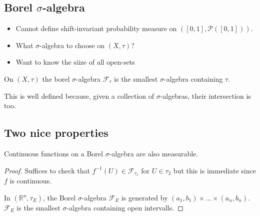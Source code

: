 \documentclass[../main.tex]{subfiles}
\begin{document}
\subsection{Borel $\sigma$-algebra}
\begin{itemize}
	\item Cannot define shift-invariant probability measure on $ ( [ 0,1] , \mathcal{P}( [ 0,1] ) ) $.
	\item What $\sigma$-algebra to choose on $( X,\tau) $?
	\item Want to know the siize of all open-sets
\end{itemize}
\begin{defn}
	On $( X,\tau) $ the borel $\sigma$-algebra $ \mathcal{F}_{\tau} $ is the smallest $\sigma$-algebra containing $\tau$.
\end{defn}
This is well defined because, given a collection of $\sigma$-algebras, their intersection is too.
\subsection*{Two nice properties}
\begin{itemize}
\item Continuous functions on a Borel $\sigma$-algebra are also measurable.
	\begin{proof}
		Suffices to check that $f^{-1}( U) \in \mathcal{F}_{\tau_1} $ for $U\in \tau_2$ but this is immediate since $f$ is continuous.
	\item In $( \mathbb{R}^{n},\tau_E )$, the Borel $\sigma$-algebra $ \mathcal{F}_E$ is generated by $( a_1,b_1) \times ... \times( a_n,b_n) $. $ \mathcal{F}_E$ is the smallest $\sigma$-algebra containing open intervalls.
	\end{proof}
	
\end{itemize}
\end{document}
